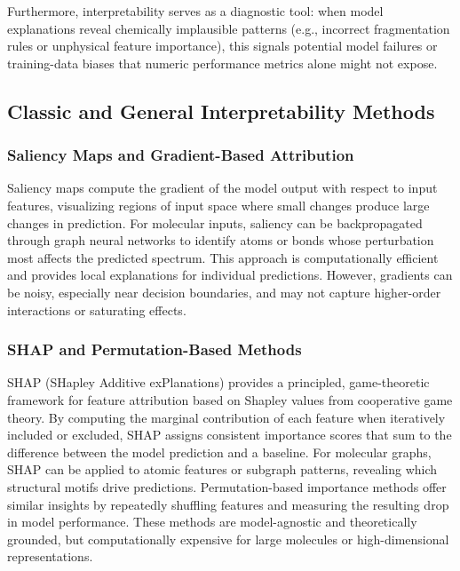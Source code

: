 Furthermore, interpretability serves as a diagnostic tool: when model explanations reveal chemically implausible patterns (e.g., incorrect fragmentation rules or unphysical feature importance), this signals potential model failures or training-data biases that numeric performance metrics alone might not expose.

\subsection{Classic and General Interpretability Methods}

\subsubsection{Saliency Maps and Gradient-Based Attribution}

Saliency maps compute the gradient of the model output with respect to input features, visualizing regions of input space where small changes produce large changes in prediction. 
For molecular inputs, saliency can be backpropagated through graph neural networks to identify atoms or bonds whose perturbation most affects the predicted spectrum. \cite[p.~4]{Simonyan2013}
This approach is computationally efficient and provides local explanations for individual predictions. 
However, gradients can be noisy, especially near decision boundaries, and may not capture higher-order interactions or saturating effects. \cite{Bach2015}

\subsubsection{SHAP and Permutation-Based Methods}

SHAP (SHapley Additive exPlanations) provides a principled, game-theoretic framework for feature attribution based on Shapley values from cooperative game theory. \cite[p.~3]{Lundberg2017}
By computing the marginal contribution of each feature when iteratively included or excluded, SHAP assigns consistent importance scores that sum to the difference between the model prediction and a baseline. \cite[p.~2]{Lundberg2017}
For molecular graphs, SHAP can be applied to atomic features or subgraph patterns, revealing which structural motifs drive predictions.
Permutation-based importance methods offer similar insights by repeatedly shuffling features and measuring the resulting drop in model performance. \cite[p.~23]{Breiman2001}
These methods are model-agnostic and theoretically grounded, but computationally expensive for large molecules or high-dimensional representations.

